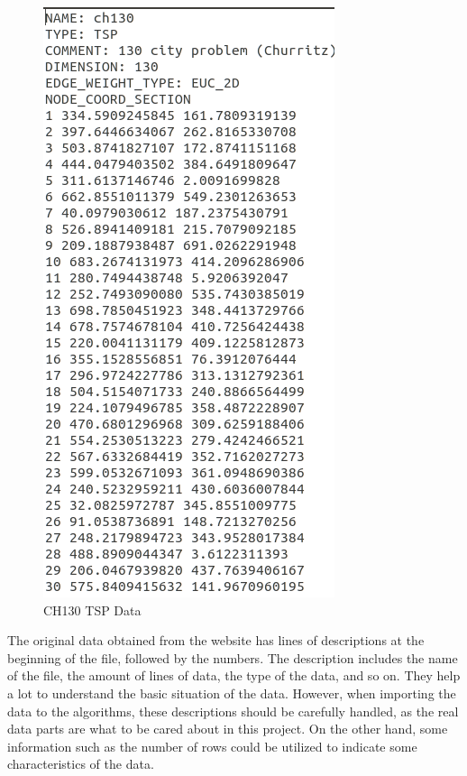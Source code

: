 \documentclass{article}
\begin{document}
 \begin{figure}[h]
  \begin{center}
    \includegraphics[scale=0.53]{image4}
  \end{center}
  \caption{CH130 TSP Data}
\end{figure}

\bigskip

The original data obtained from the website has lines of descriptions at the beginning of the file, followed by the numbers. The description includes the name of the file, the amount of lines of data, the type of the data, and so on. They help a lot to understand the basic situation of the data. However, when importing the data to the algorithms, these descriptions should be carefully handled, as the real data parts are what to be cared about in this project. On the other hand, some information such as the number of rows could be utilized to indicate some characteristics of the data.
\end{document}
